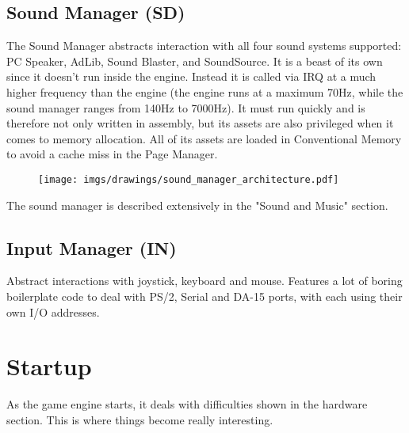 \documentclass[book.tex]{subfiles}
\begin{document}
\subsection{Sound Manager (SD)}
The Sound Manager abstracts interaction with all four sound systems supported: PC Speaker, AdLib, Sound Blaster, and SoundSource. It is a beast of its own since it doesn't run inside the engine. Instead it is called via IRQ at a much higher frequency than the engine (the engine runs at a maximum 70Hz, while the sound manager ranges from 140Hz to 7000Hz). It must run quickly and is therefore not only written in assembly, but its assets are also privileged when it comes to memory allocation. All of its assets are loaded in Conventional Memory to avoid a cache miss in the Page Manager.\\
 \par
\begin{figure}[H]
\centering
 \texttt{[image: imgs/drawings/sound\_manager\_architecture.pdf]}
 \end{figure}
 \par
The sound manager is described extensively in the "Sound and Music" section.

















\subsection{Input Manager (IN)}
Abstract interactions with joystick, keyboard and mouse. Features a lot of boring boilerplate code to deal with PS/2, Serial and DA-15 ports, with each using their own I/O addresses.
















\section{Startup}
As the game engine starts, it deals with difficulties shown in the hardware section. This is where things become really interesting.
\end{document}
